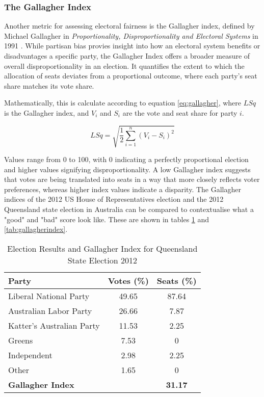 \documentclass{article}
\begin{document}
\subsubsection{The Gallagher Index}

Another metric for assessing electoral fairness is the Gallagher index, defined by Michael Gallagher in \textit{Proportionality, Disproportionality and Electoral Systems} in 1991 \cite{gallagher}.
While partisan bias provies insight into how an electoral system benefits or disadvantages a specific party, the Gallagher Index offers a broader measure of overall disproportionality in an 
election. It quantifies the extent to which the allocation of seats deviates from a proportional outcome, where each party's seat share matches its vote share.

Mathematically, this is calculate according to equation \ref{eq:gallagher}, where $LSq$ is the Gallagher index, and $V_i$ and $S_i$ are the vote and seat share for party $i$.

\begin{equation}
    LSq = \sqrt{\frac{1}{2} \sum_{i=1}^{n} (V_i - S_i)^2}
    \label{eq:gallagher}
\end{equation}

Values range from 0 to 100, with 0 indicating a perfectly proportional election and higher values signifying disproportionality. A low Gallagher index suggests that votes are being
translated into seats in a way that more closely reflects voter preferences, whereas higher index values indicate a disparity. The Gallagher indices of the 2012 US House of Representatives 
election and the 2012 Queensland state election in Australia can be compared to contextualise what a "good" and "bad" score look like. These are shown in tables \ref{tab:queensland2012} and \ref{tab:gallagherindex}.

\begin{table}[H]
    \centering
    \begin{tabular}{|l|c|c|}
        \hline
        Party & Votes (\%) & Seats (\%) \\
        \hline
        Liberal National Party & 49.65 & 87.64 \\
        Australian Labor Party & 26.66 & 7.87 \\
        Katter's Australian Party & 11.53 & 2.25 \\
        Greens & 7.53 & 0 \\
        Independent & 2.98 & 2.25 \\
        Other & 1.65 & 0 \\
        \hline
        \textbf{Gallagher Index} & & \textbf{31.17} \\
        \hline
    \end{tabular}
    \caption{Election Results and Gallagher Index for Queensland State Election 2012 \cite{queensland2012}}
    \label{tab:queensland2012}
\end{table}
\end{document}
